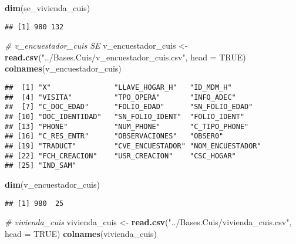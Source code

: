 \documentclass[11pt,]{article}
\newenvironment{Shaded}{\begin{snugshade}}{\end{snugshade}}
\newcommand{\KeywordTok}[1]{\textcolor[rgb]{0.13,0.29,0.53}{\textbf{#1}}}
\newcommand{\DataTypeTok}[1]{\textcolor[rgb]{0.13,0.29,0.53}{#1}}
\newcommand{\StringTok}[1]{\textcolor[rgb]{0.31,0.60,0.02}{#1}}
\newcommand{\CommentTok}[1]{\textcolor[rgb]{0.56,0.35,0.01}{\textit{#1}}}
\newcommand{\OtherTok}[1]{\textcolor[rgb]{0.56,0.35,0.01}{#1}}
\newcommand{\NormalTok}[1]{#1}
\begin{document}
\begin{Shaded}
\begin{Highlighting}[]
\KeywordTok{dim}\NormalTok{(se_vivienda_cuis)}
\end{Highlighting}
\end{Shaded}

\begin{verbatim}
## [1] 980 132
\end{verbatim}

\begin{Shaded}
\begin{Highlighting}[]
\CommentTok{# v_encuestador_cuis SE}
\NormalTok{v_encuestador_cuis <-}\StringTok{ }\KeywordTok{read.csv}\NormalTok{(}\StringTok{"../Bases.Cuis/v_encuestador_cuis.csv"}\NormalTok{, }\DataTypeTok{head =} \OtherTok{TRUE}\NormalTok{)}
\KeywordTok{colnames}\NormalTok{(v_encuestador_cuis)}
\end{Highlighting}
\end{Shaded}

\begin{verbatim}
##  [1] "X"               "LLAVE_HOGAR_H"   "ID_MDM_H"       
##  [4] "VISITA"          "TPO_OPERA"       "INFO_ADEC"      
##  [7] "C_DOC_EDAD"      "FOLIO_EDAD"      "SN_FOLIO_EDAD"  
## [10] "DOC_IDENTIDAD"   "SN_FOLIO_IDENT"  "FOLIO_IDENT"    
## [13] "PHONE"           "NUM_PHONE"       "C_TIPO_PHONE"   
## [16] "C_RES_ENTR"      "OBSERVACIONES"   "OBSER0"         
## [19] "TRADUCT"         "CVE_ENCUESTADOR" "NOM_ENCUESTADOR"
## [22] "FCH_CREACION"    "USR_CREACION"    "CSC_HOGAR"      
## [25] "IND_SAM"
\end{verbatim}

\begin{Shaded}
\begin{Highlighting}[]
\KeywordTok{dim}\NormalTok{(v_encuestador_cuis)}
\end{Highlighting}
\end{Shaded}

\begin{verbatim}
## [1] 980  25
\end{verbatim}

\begin{Shaded}
\begin{Highlighting}[]
\CommentTok{# vivienda_cuis}
\NormalTok{vivienda_cuis <-}\StringTok{ }\KeywordTok{read.csv}\NormalTok{(}\StringTok{"../Bases.Cuis/vivienda_cuis.csv"}\NormalTok{, }\DataTypeTok{head =} \OtherTok{TRUE}\NormalTok{)}
\KeywordTok{colnames}\NormalTok{(vivienda_cuis)}
\end{Highlighting}
\end{Shaded}
\end{document}
